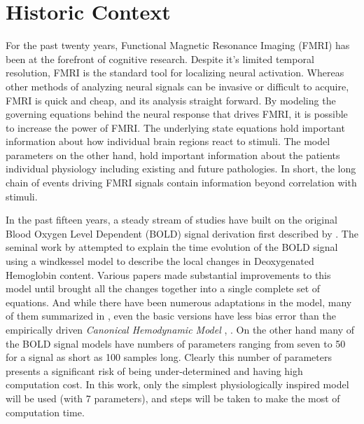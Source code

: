 \section{Historic Context}
For the past twenty years, Functional Magnetic Resonance Imaging (FMRI) 
has been at the forefront of cognitive research. Despite it's
limited temporal resolution, FMRI is the standard tool for localizing 
neural activation.  Whereas other methods
of analyzing neural signals can be invasive or difficult to acquire, 
FMRI is quick and cheap, and its analysis straight forward.
By modeling the governing equations behind the neural response that
drives FMRI, it is possible to increase the power of FMRI.
The underlying state equations hold important information
about how individual brain regions react to stimuli. The model parameters
on the other hand, hold important information about the patients individual
physiology including existing and future pathologies. In short,
the long chain of events driving FMRI signals contain information 
beyond correlation with stimuli.

In the past fifteen years, a steady stream of studies have built
on the original Blood Oxygen Level Dependent (BOLD) signal 
derivation first described by \cite{Ogawa}.
The seminal work by \cite{Buxton1998} attempted to explain the
time evolution of the BOLD signal using a windkessel model to
describe the local changes in Deoxygenated Hemoglobin content.
Various papers made substantial improvements to this model until
\cite{Buxton2004} brought all the changes together into a single complete 
set of equations. And while there have been numerous adaptations in the model, 
many of them summarized in \cite{Deneux2006}, even the basic versions
have less bias error than the empirically driven \emph{Canonical Hemodynamic Model}
\cite{Deneux2006}, \cite{Handwerker2004}.
On the other hand many of the BOLD signal models have numbers
of parameters ranging from seven \cite{Riera2004} to 50 \cite{Behzadi2005} 
for a signal as short as 100 samples long. Clearly this number of parameters presents
a significant risk of being under-determined and having high computation cost. 
In this work, only the simplest physiologically inspired model will be
used (with 7 parameters), and steps will be taken to make the most of computation
time.

